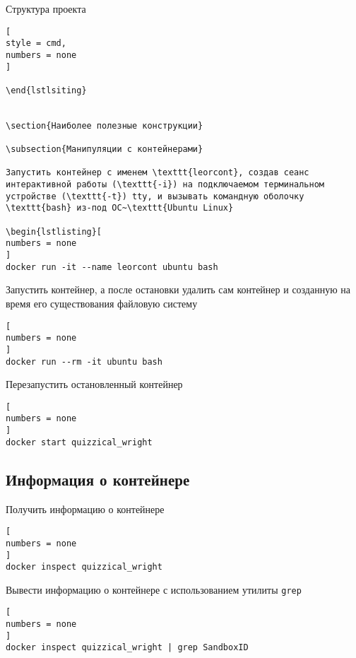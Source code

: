 \documentclass[%
	11pt,
	a4paper,
	utf8,
		]{article}
\begin{document}
Структура проекта
\begin{lstlisting}[
style = cmd,
numbers = none
]

\end{lstlsiting}


\section{Наиболее полезные конструкции}

\subsection{Манипуляции с контейнерами}

Запустить контейнер с именем \texttt{leorcont}, создав сеанс интерактивной работы (\texttt{-i}) на подключаемом терминальном устройстве (\texttt{-t}) tty, и вызывать командную оболочку \texttt{bash} из-под ОС~\texttt{Ubuntu Linux}

\begin{lstlisting}[
numbers = none
]
docker run -it --name leorcont ubuntu bash
\end{lstlisting}

Запустить контейнер, а после остановки удалить сам контейнер и созданную на время его существования файловую систему

\begin{lstlisting}[
numbers = none
]
docker run --rm -it ubuntu bash
\end{lstlisting}

Перезапустить остановленный контейнер

\begin{lstlisting}[
numbers = none
]
docker start quizzical_wright
\end{lstlisting}

\subsection{Информация о контейнере}

Получить информацию о контейнере

\begin{lstlisting}[
numbers = none
]
docker inspect quizzical_wright
\end{lstlisting}

Вывести информацию о контейнере с использованием утилиты \texttt{grep}

\begin{lstlisting}[
numbers = none
]
docker inspect quizzical_wright | grep SandboxID
\end{lstlisting}
\end{document}
